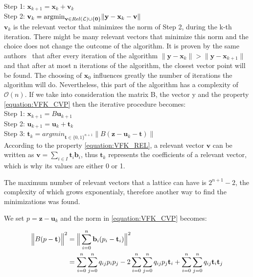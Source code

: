 \documentclass{amsart}
\numberwithin{equation}{section}
\def\L{\mathcal{L}}
\begin{document}
Step 1: $ \textbf{x}_{k+1} = \textbf{x}_k + \textbf{v}_k$ \\

Step 2: $ \textbf{v}_k = {\rm{argmin}}_{\textbf{v} \in Rel(\L) \cup \{{\textbf 0}\}} \| \textbf{y}-\textbf{x}_k-\textbf{v} \| $ \\

$\textbf{v}_k$ is the relevant vector that minimizes the norm of Step 2, during the k-th iteration. There might be many relevant vectors that minimize this norm and the choice does not change the outcome of the algorithm. It is proven by the same authors~\cite{VFK-CVP} that after every iteration of the algorithm $ \|\textbf{y}-\textbf{x}_k \| > \| \textbf{y}-\textbf{x}_{k+1}\| $ and that after at most n iterations of the algorithm, the closest vector point will be found. The choosing of $\textbf{x}_0$ influences greatly the number of iterations the algorithm will do. Nevertheless, this part of the algorithm has a complexity of $\mathcal{O}(n)$. If we take into consideration the matrix B, the vector y and the property \eqref{equation:VFK_CVP} then the iterative procedure becomes:\\

Step 1: $ \textbf{x}_{k+1} = B\textbf{u}_{k+1}$ \\

Step 2: $ \textbf{u}_{k+1} = \textbf{u}_k + \textbf{t}_k$ \\

Step 3: $ \textbf{t}_k = argmin_{\textbf{t} \in \{0,1\}^{n+1}} \| B(\textbf{z}-\textbf{u}_k-\textbf{t}) \| $ \\

According to the property \eqref{equation:VFK_REL}, a relevant vector $\textbf{v}$ can be written as $\textbf{v} = \sum_{i \in I}\textbf{t}_i\textbf{b}_i$, thus $\textbf{t}_k$ represents the coefficients of a relevant vector, which is why its values are either 0 or 1.

The maximum number of relevant vectors that a lattice can have is $2^{n+1}-2$, the complexity of which grows exponentialy, therefore another way to find the minimizations was found.


We set $p=\textbf{z}-\textbf{u}_k$ and the norm in \eqref{equation:VFK_CVP} becomes:

\begin{equation}
\begin{split}
\Big{\|} B(p-\textbf{t}) \Big{\|}^2 & =  \Big{\|} \sum_{i=0}^{n}{\textbf{b}_i(p_i-\textbf{t}_i)} \Big{\|}^2 \\ & = \sum_{i=0}^{n}\sum_{j=0}^{n}q_{ij}p_ip_j - 2\sum_{i=0}^{n}\sum_{j=0}^{n}q_{ij}p_j \textbf{t}_i + \sum_{i=0}^{n}\sum_{j=0}^{n}q_{ij}\textbf{t}_i\textbf{t}_j
\end{split}
\label{equation:VFK_CVP_MIN}
\end{equation}
\end{document}
